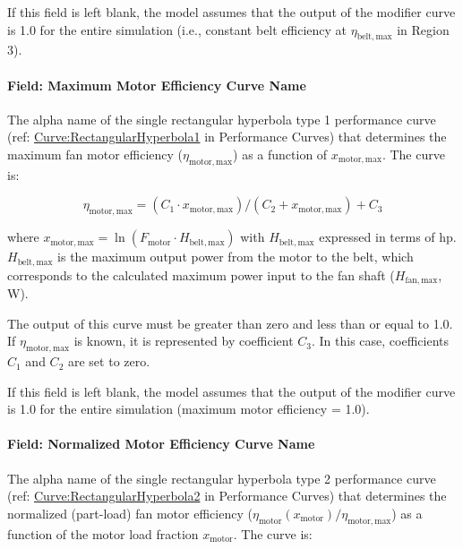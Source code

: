If this field is left blank, the model assumes that the output of the modifier curve is 1.0 for the entire simulation (i.e., constant belt efficiency at \(\eta_{\mathrm{belt, max}}\) in Region 3).

\paragraph{Field: Maximum Motor Efficiency Curve Name}\label{field-maximum-motor-efficiency-curve-name}

The alpha name of the single rectangular hyperbola type 1 performance curve (ref: \hyperref[curverectangularhyperbola1]{Curve:RectangularHyperbola1} in Performance Curves) that determines the maximum fan motor efficiency (\(\eta_{\mathrm{motor, max}}\)) as a function of \(x_{\mathrm{motor, max}}\). The curve is:

\begin{equation}
  \eta_{\mathrm{motor, max}} = (C_1 \cdot x_{\mathrm{motor, max}}) / (C_2 + x_{\mathrm{motor, max}}) + C_3
\end{equation}

where \(x_{\mathrm{motor, max}} = \ln(F_{\mathrm{motor}} \cdot H_{\mathrm{belt, max}})\) with \(H_{\mathrm{belt, max}}\) expressed in terms of hp. \(H_{\mathrm{belt, max}}\) is the maximum output power from the motor to the belt, which corresponds to the calculated maximum power input to the fan shaft (\(H_{\mathrm{fan, max}}\), W).

The output of this curve must be greater than zero and less than or equal to 1.0. If \(\eta_{\mathrm{motor, max}}\) is known, it is represented by coefficient \(C_3\). In this case, coefficients \(C_1\) and \(C_2\) are set to zero.

If this field is left blank, the model assumes that the output of the modifier curve is 1.0 for the entire simulation (maximum motor efficiency = 1.0).

\paragraph{Field: Normalized Motor Efficiency Curve Name}\label{field-normalized-motor-efficiency-curve-name}

The alpha name of the single rectangular hyperbola type 2 performance curve (ref: \hyperref[curverectangularhyperbola2]{Curve:RectangularHyperbola2} in Performance Curves) that determines the normalized (part-load) fan motor efficiency (\(\eta_{\mathrm{motor}} (x_{\mathrm{motor}}) /  \eta_{\mathrm{motor, max}}\)) as a function of the motor load fraction \(x_{\mathrm{motor}}\). The curve is:

